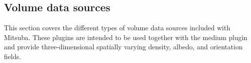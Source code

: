 \newpage
\subsection{Volume data sources}
\label{sec:volumes}
This section covers the different types of volume data sources included with
Mitsuba. These plugins are intended to be used together with the
 medium plugin and provide three-dimensional spatially varying
density, albedo, and orientation fields.
